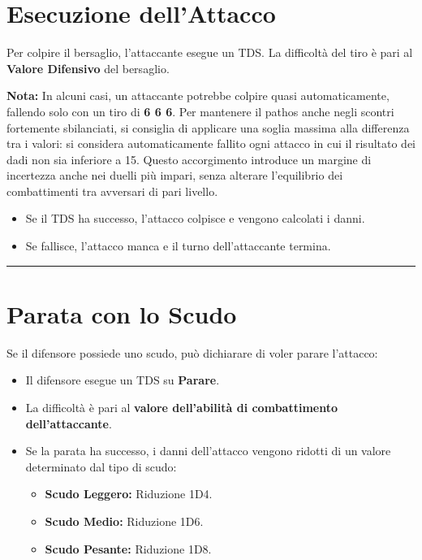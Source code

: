 \documentclass[../manuale_main.tex]{subfiles}
\begin{document}
\section{Esecuzione dell'Attacco}
Per colpire il bersaglio, l'attaccante esegue un TDS. La difficoltà del tiro è pari al \textbf{Valore Difensivo} del bersaglio. 

\textbf{Nota:} In alcuni casi, un attaccante potrebbe colpire quasi automaticamente, fallendo solo con un tiro di \textbf{6 6 6}. Per mantenere il pathos anche negli scontri fortemente sbilanciati, si consiglia di applicare una soglia massima alla differenza tra i valori: si considera automaticamente fallito ogni attacco in cui il risultato dei dadi non sia inferiore a 15. Questo accorgimento introduce un margine di incertezza anche nei duelli più impari, senza alterare l’equilibrio dei combattimenti tra avversari di pari livello.

\begin{itemize}
    \item Se il TDS ha successo, l'attacco colpisce e vengono calcolati i danni.
    \item Se fallisce, l'attacco manca e il turno dell'attaccante termina.
\end{itemize}


\vspace{0.5cm}
\noindent
\begin{center}
\rule{\textwidth}{0.4pt} 
\end{center}
\vspace{0.5cm}

\section{Parata con lo Scudo}
Se il difensore possiede uno scudo, può dichiarare di voler parare l'attacco:

\begin{itemize}
    \item Il difensore esegue un TDS su \textbf{Parare}.
    \item La difficoltà è pari al \textbf{valore dell'abilità di combattimento dell'attaccante}.
    \item Se la parata ha successo, i danni dell'attacco vengono ridotti di un valore determinato dal tipo di scudo:
    \begin{itemize}
        \item \textbf{Scudo Leggero:} Riduzione 1D4.
        \item \textbf{Scudo Medio:} Riduzione 1D6.
        \item \textbf{Scudo Pesante:} Riduzione 1D8.
    \end{itemize}
\end{itemize}
\end{document}
